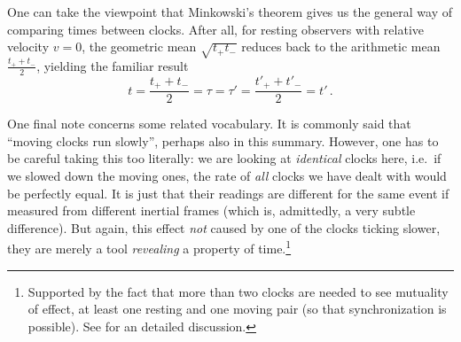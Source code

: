 


One can take the viewpoint that Minkowski's theorem gives us the general way of comparing times between clocks. After all, for resting observers with relative velocity $v = 0$, the geometric mean $\sqrt{t_+ t_-}$ reduces back to the arithmetic mean $\frac{t_+ + t_-}{2}$, yielding the familiar result
\begin{equation}
	t = \frac{t_+ + t_-}{2} = \tau = \tau' = \frac{t'_+ + t'_-}{2} = t' \, .
\end{equation}


One final note concerns some related vocabulary. It is commonly said that \enquote{moving clocks run slowly}, perhaps also in this summary. However, one has to be careful taking this too literally: we are looking at \emph{identical} clocks here, i.e.~if we slowed down the moving ones, the rate of \emph{all} clocks we have dealt with would be perfectly equal. It is just that their readings are different for the same event if measured from different inertial frames (which is, admittedly, a very subtle difference). But again, this effect \emph{not} caused by one of the clocks ticking slower, they are merely a tool \emph{revealing} a property of time.\footnote{Supported by the fact that more than two clocks are needed to see mutuality of effect, at least one resting and one moving pair (so that synchronization is possible). See \cite{giulini_srt} for an detailed discussion.}







